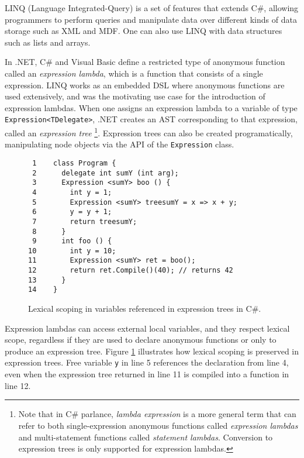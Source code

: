 \documentclass[english]{llncs}
\begin{document}

LINQ (Language Integrated-Query) \cite{linq} is a set of features that
extends C\#, allowing programmers to perform queries and manipulate data over
different kinds of data storage such as XML and MDF.
One can also use LINQ with data structures such as lists and arrays.

In .NET, C\# and Visual Basic define a restricted type of anonymous
function called an \emph{expression lambda}, which is a function that
consists of a single expression. LINQ works as an embedded DSL
\cite{Fowler:2010:DSL:1809745} where anonymous functions are used
extensively, and was the motivating use case for the introduction
of expression lambdas. When one assigns an expression lambda to a variable
of type \texttt{Expression<TDelegate>}, .NET creates an AST
corresponding to that expression, called an \emph{expression tree}
\footnote{Note that in C\# parlance, \emph{lambda expression} is a
more general term that can refer to both single-expression anonymous functions
called \emph{expression lambdas} and multi-statement functions called
\emph{statement lambdas}. Conversion to expression trees is only supported for
expression lambdas.}. Expression trees can also be created
programatically, manipulating node objects via the API of the
\texttt{Expression} class.

\begin{figure}[t]
\begin{verbatim}
 1    class Program {
 2      delegate int sumY (int arg);
 3      Expression <sumY> boo () {
 4        int y = 1;
 5        Expression <sumY> treesumY = x => x + y;
 6        y = y + 1;
 7        return treesumY;
 8      }
 9      int foo () {
10        int y = 10;
11        Expression <sumY> ret = boo();
12        return ret.Compile()(40); // returns 42
13      }
14    }
\end{verbatim}
\protect\caption{\label{fig:ExpressionTrees}Lexical scoping in variables
referenced in expression trees in C\#.}
\end{figure}

Expression lambdas can access external local variables, and they respect
lexical scope, regardless if they are used to declare anonymous functions or
only to produce an expression tree. Figure
\ref{fig:ExpressionTrees} illustrates how lexical scoping is preserved in
expression trees. Free variable \texttt{y} in line 5 references the declaration
from line 4, even when the expression tree returned in line 11 is compiled
into a function in line 12.
\end{document}
